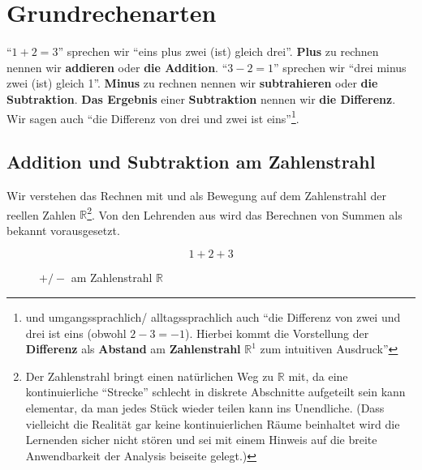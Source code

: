 \documentclass[a4paper]{book}%
\theoremstyle{definition}
\begin{document}
\chapter{Grundrechenarten}\label{Grundrechenarten}

\enquote{$1+2=3$} sprechen wir \enquote{eins plus zwei (ist) gleich drei}. \textbf{Plus} zu rechnen nennen wir \textbf{addieren} oder \textbf{die Addition}. \enquote{$3-2=1$} sprechen wir \enquote{drei minus zwei (ist) gleich 1}. \textbf{Minus} zu rechnen nennen wir \textbf{subtrahieren} oder \textbf{die Subtraktion}. \textbf{Das Ergebnis} einer \textbf{Subtraktion} nennen wir \textbf{die Differenz}. Wir sagen auch \enquote{die Differenz von drei und zwei ist eins}\footnote{und umgangssprachlich/ alltagssprachlich auch \enquote{die Differenz von zwei und drei ist eins (obwohl $2-3=-1$). Hierbei kommt die Vorstellung der \textbf{Differenz} als \textbf{Abstand} am \textbf{Zahlenstrahl} $\mathbb{R}^1$ zum intuitiven Ausdruck}}.

\section{Addition und Subtraktion am Zahlenstrahl}

Wir verstehen das Rechnen mit  und  als Bewegung auf dem Zahlenstrahl der reellen Zahlen $\mathbb{R}$\footnote{Der Zahlenstrahl bringt einen natürlichen Weg zu $\mathbb{R}$ mit, da eine kontinuierliche \enquote{Strecke} schlecht in diskrete Abschnitte aufgeteilt sein kann elementar, da man jedes Stück wieder teilen kann ins Unendliche. (Dass vielleicht die Realität gar keine kontinuierlichen Räume beinhaltet wird die Lernenden sicher nicht stören und sei mit einem Hinweis auf die breite Anwendbarkeit der Analysis beiseite gelegt.)}. Von den Lehrenden aus wird das Berechnen von Summen als bekannt vorausgesetzt.

\begin{equation}\label{eqn:00001}
    1 + 2 + 3
\end{equation}

\begin{figure}[H]
  \centering
{}
  \caption{$+/-$ am Zahlenstrahl $\mathbb{R}$}\label{fig:zahlenstrahlAddition}
\end{figure}
\end{document}
